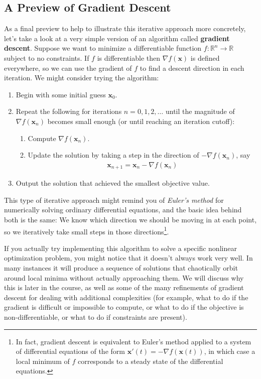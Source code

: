 \documentclass[11pt]{article}
\theoremstyle{definition} %
\begin{document}
\subsection{A Preview of Gradient Descent}
\label{subsec:descent}

As a final preview to help to illustrate this iterative approach more concretely, let's take a look at a very simple version of an algorithm called \textbf{gradient descent}. Suppose we want to minimize a differentiable function $f : \mathbb{R}^n \to \mathbb{R}$ subject to no constraints. If $f$ is differentiable then $\nabla f(\mathbf{x})$ is defined everywhere, so we can use the gradient of $f$ to find a descent direction in each iteration. We might consider trying the algorithm:
\begin{enumerate}
	\item Begin with some initial guess $\mathbf{x}_0$.
	\item Repeat the following for iterations $n=0,1,2,\dots$ until the magnitude of $\nabla f(\mathbf{x}_n)$ becomes small enough (or until reaching an iteration cutoff):
	\begin{enumerate}
		\item Compute $\nabla f(\mathbf{x}_n)$.
		\item Update the solution by taking a step in the direction of $-\nabla f(\mathbf{x}_n)$, say
		\begin{align*}
			\mathbf{x}_{n+1} = \mathbf{x}_n - \nabla f(\mathbf{x}_n)
		\end{align*}
	\end{enumerate}
	\item Output the solution that achieved the smallest objective value.
\end{enumerate}

This type of iterative approach might remind you of \textit{Euler's method} for numerically solving ordinary differential equations, and the basic idea behind both is the same: We know which direction we should be moving in at each point, so we iteratively take small steps in those directions\footnote{In fact, gradient descent is equivalent to Euler's method applied to a system of differential equations of the form $\mathbf{x}'(t) = -\nabla f(\mathbf{x}(t))$, in which case a local minimum of $f$ corresponds to a steady state of the differential equations.}.

If you actually try implementing this algorithm to solve a specific nonlinear optimization problem, you might notice that it doesn't always work very well. In many instances it will produce a sequence of solutions that chaotically orbit around local minima without actually approaching them. We will discuss why this is later in the course, as well as some of the many refinements of gradient descent for dealing with additional complexities (for example, what to do if the gradient is difficult or impossible to compute, or what to do if the objective is non-differentiable, or what to do if constraints are present).
\end{document}
